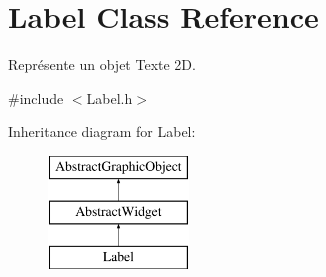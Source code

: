 \hypertarget{classLabel}{\section{Label Class Reference}
\label{classLabel}
}


Représente un objet Texte 2\-D.  




{\ttfamily \#include $<$Label.\-h$>$}

Inheritance diagram for Label\-:\begin{figure}[H]
\begin{center}
\leavevmode
\includegraphics[height=3.000000cm]{classLabel}
\end{center}
\end{figure}

